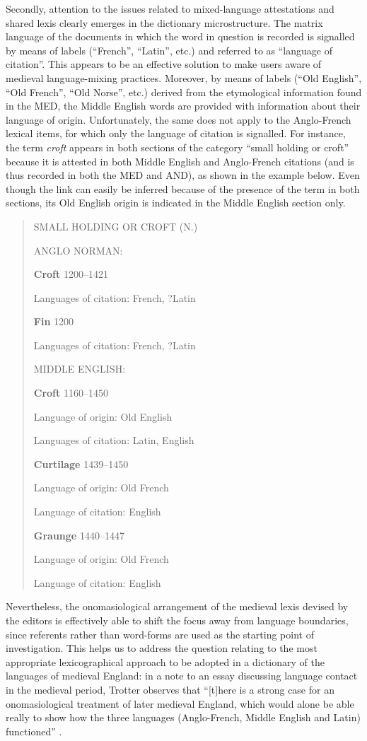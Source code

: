 \documentclass[output=paper,colorlinks,citecolor=brown,arabicfont,chinesefont]{langscibook}
\begin{document}
Secondly, attention to the issues related to mixed-language attestations and shared lexis clearly emerges in the dictionary microstructure. The matrix language of the documents in which the word in question is recorded is signalled by means of labels (“French”, “Latin”, etc.) and referred to as “language of citation”. This appears to be an effective solution to make users aware of medieval language-mixing practices. Moreover, by means of labels (“Old English”, “Old French”, “Old Norse”, etc.) derived from the etymological information found in the MED, the Middle English words are provided with information about their language of origin. Unfortunately, the same does not apply to the Anglo-French lexical items, for which only the language of citation is signalled. For instance, the term \emph{croft} appears in both sections of the category “small holding or croft” because it is attested in both Middle English and Anglo-French citations (and is thus recorded in both the MED and AND), as shown in the example below. Even though the link can easily be inferred because of the presence of the term in both sections, its Old English origin is indicated in the Middle English section only.

\begin{quote}
SMALL HOLDING OR CROFT (N.)

ANGLO NORMAN:

\textbf{Croft} 1200--1421

Languages of citation: French, ?Latin

\textbf{Fin} 1200

Languages of citation: French, ?Latin

MIDDLE ENGLISH:

\textbf{Croft} 1160--1450

Language of origin: Old English

Languages of citation: Latin, English

\textbf{Curtilage} 1439--1450

Language of origin: Old French

Language of citation: English

\textbf{Graunge} 1440--1447

Language of origin: Old French

Language of citation: English
\end{quote}

Nevertheless, the onomasiological arrangement of the medieval lexis devised by the \citet{[BTh]} editors is effectively able to shift the focus away from language boundaries, since referents rather than word-forms are used as the starting point of investigation. This helps us to address the question relating to the most appropriate lexicographical approach to be adopted in a dictionary of the languages of medieval England: in a note to an essay discussing language contact in the medieval period, Trotter observes that “[t]here is a strong case for an onomasiological treatment of later medieval England, which would alone be able really to show how the three languages (Anglo-French, Middle English and Latin) functioned” \citep[35]{Trotter1996}.
\end{document}
